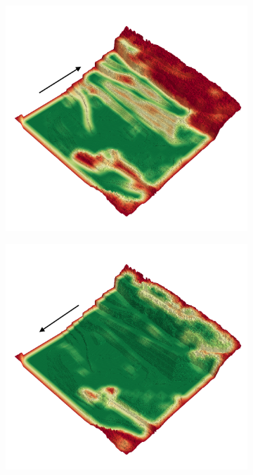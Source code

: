\documentclass[../document.tex]{subfiles}
\begin{document}
\begin{figure} [htbp]
\centering
\begin{subfigure}[b]{0.45\textwidth}
  \includegraphics[width=\linewidth]{../img/4/traversability/quarry/-270.png} 
\end{subfigure}
\begin{subfigure}[b]{0.45\textwidth}
    \includegraphics[width=\linewidth]{../img/4/traversability/quarry/-90.png}

\end{subfigure}
\end{figure}
\end{document}
